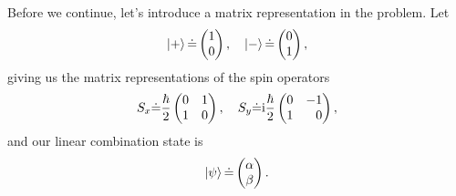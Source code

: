 \documentclass[11pt,letter, swedish, english
]{article}
\begin{document}
Before we continue, let's introduce a matrix representation in the
problem. Let
\begin{equation}
\ket{+} \dot= \begin{pmatrix} 1\\0 \end{pmatrix}
\qcomma \ket{-} \dot= \begin{pmatrix} 0\\1 \end{pmatrix},
\end{equation}
giving us the matrix representations of the spin operators
\begin{equation}
S_x \dot= \frac{\hbar}{2}\begin{pmatrix} 0&1\\1&0 \end{pmatrix}
\qcomma
S_y \dot= \ii\frac{\hbar}{2}\begin{pmatrix*}[r] 0&-1\\1&0 \end{pmatrix*},
\end{equation}
and our linear combination state is
\begin{equation}
\ket{\psi} \dot= \begin{pmatrix} \alpha\\\beta \end{pmatrix}.
\end{equation}
\end{document}
